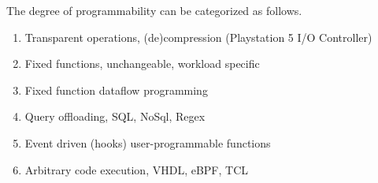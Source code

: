 The degree of programmability can be categorized as follows.

\begin{enumerate}
    \item Transparent operations, (de)compression (Playstation 5 I/O Controller)
    \item Fixed functions, unchangeable, workload specific \cite{2013-fast-active-flash}
    \item Fixed function dataflow programming \cite{Wickremesinghe02distributedcomputing}
    \item Query offloading, SQL, NoSql, Regex \cite{10.14778/2994509.2994512}
    \item Event driven (hooks) user-programmable functions \cite{10.1145/3429357.3430519}
    \item Arbitrary code execution, VHDL, eBPF, TCL \cite{10.1145/605432.605425, kourtis2020safe}
\end{enumerate}

\onecolumn

